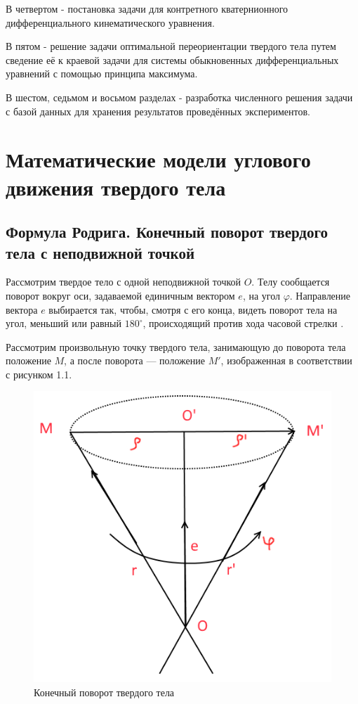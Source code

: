 \documentclass[14pt]{extreport}
\renewcommand{\phi}{\varphi} %
\begin{document}
В четвертом - постановка задачи для контретного кватернионного дифференциального кинематического уравнения.

В пятом - решение задачи оптимальной переориентации твердого тела путем сведение её к краевой задачи для системы обыкновенных дифференциальных уравнений с помощью принципа максимума.

В шестом, седьмом и восьмом разделах - разработка численного решения задачи с базой данных для хранения результатов проведённых экспериментов.

\chapter{Математические модели углового движения твердого тела}
\section{Формула Родрига. Конечный поворот твердого тела с неподвижной точкой}

Рассмотрим твердое тело с одной неподвижной точкой $O$. Телу сообща­ется поворот вокруг оси, задаваемой единичным вектором $e$, на угол $\phi$. Направление вектора $e$ выбирается так, чтобы, смотря с его конца, видеть поворот тела на угол, меньший или равный $180^{\circ}$, происходящий против хода часовой стрелки \cite{chelnokov}.

Рассмотрим произвольную точку твердого тела, занимающую до по­ворота тела положение $M$, а после поворота — положение $M'$, изображенная в соответствии с рисунком 1.1.

\begin{figure}[H]
\center\includegraphics[scale=0.5]{fig/img11.png}
\caption{Конечный поворот твердого тела}
\end{figure}
\end{document}
